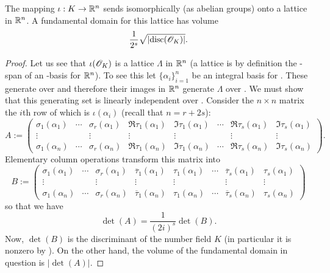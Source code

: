 \documentclass[10pt,a4paper,reqno]{amsart}
\begin{document}
\begin{thm}
The mapping $\iota : K \rightarrow \mathbb{R}^n$ sends \OK{} isomorphically (as abelian
groups) onto a lattice in $\mathbb{R}^n$. A fundamental domain for this lattice has
volume \[\frac{1}{2^s}\sqrt{|\mathrm{disc}(\mathscr{O}_K)|}.\]
\end{thm}
\begin{proof}
Let us see that $\iota(\mathscr{O}_K)$ is a lattice $\Lambda$ in $\mathbb{R}^n$ (a lattice is by
definition the \Z-span of an \R-basis for $\mathbb{R}^n$). To see this let
$\{\alpha_i\}_{i=1}^n$ be an integral basis for \OK. These generate \OK{} over
\Z{} and therefore their images in $\mathbb{R}^n$ generate $\Lambda$ over \Z. We must
show that this generating set is linearly independent over \R{}. Consider the
$n\times n$ matrix the $i$th row of which is $\iota(\alpha_i)$ (recall that $n
= r+2s$):
{\footnotesize
\[ A := \begin{pmatrix}
\sigma_1(\alpha_1) & \cdots & \sigma_r(\alpha_1) & \Re{\tau_1(\alpha_1)} &
\Im{\tau_1(\alpha_1)} & \cdots & \Re{\tau_s(\alpha_1)} & \Im{\tau_s(\alpha_1)}\\
\vdots & & \vdots & \vdots & \vdots & & \vdots & \vdots \\
\sigma_1(\alpha_n) & \cdots & \sigma_r(\alpha_n) & \Re{\tau_1(\alpha_n)} &
\Im{\tau_1(\alpha_n)}& \cdots & \Re{\tau_s(\alpha_n)} & \Im{\tau_s(\alpha_n)}
\end{pmatrix}. \]} Elementary column operations transform this matrix
into
\[ B := \begin{pmatrix}
\sigma_1(\alpha_1) & \cdots & \sigma_r(\alpha_1) & {\overline{\tau}_1(\alpha_1)} &
{\tau_1(\alpha_1)} & \cdots & {\overline{\tau}_s(\alpha_1)} & {\tau_s(\alpha_1)}\\
\vdots & & \vdots & \vdots & \vdots & & \vdots & \vdots \\
\sigma_1(\alpha_n) & \cdots & \sigma_r(\alpha_n) & {\overline{\tau}_1(\alpha_n)} &
{\tau_1(\alpha_n)}& \cdots & {\overline{\tau}_s(\alpha_n)} & {\tau_s(\alpha_n)}
\end{pmatrix} \] so that we have
\[\det(A) = \frac{1}{(2i)^s} \det(B).\]
Now, $\det(B)$ is the discriminant of the number field $K$ (in particular it is
nonzero by \cite[Theorem 7,p.25]{M}). On the other hand, the volume of the
fundamental domain in question is $|\det(A)|$.
\end{proof}
\end{document}
